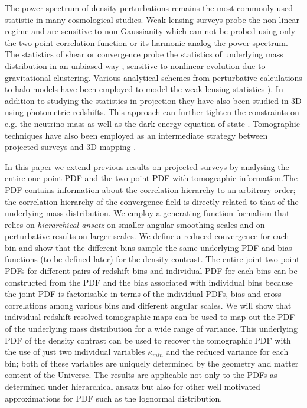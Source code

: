 \documentclass[usenatbib]{mn2e}
\begin{document}
The power spectrum of density perturbations remains the most commonly
used statistic in many cosmological studies. Weak lensing surveys probe the non-linear 
regime and are sensitive to non-Gaussianity which can not be 
probed using only the two-point correlation function or its harmonic analog the power spectrum. 
The statistics of shear or convergence probe the statistics of underlying
mass distribution in an unbiased way \citep{JSW00,MuJai01,Mu00,MuJai00,Valageas00,
VaMuBa05,TakadaWhite03,TakadaJain04}, sensitive to 
nonlinear evolution due to gravitational clustering. Various analytical schemes
from perturbative calculations to halo models have been employed to model
the weak lensing statistics \citet{Fry84,Schaeffer84, BerSch92,SzaSza93, SzaSza97, MuBaMeSch99,
MuCoMe99a, MuCoMe99b, MuMeCo99, MuCo00, MuCo02, MuCo03, CooSeth02}).
In addition to studying the statistics in projection they have also been studied in 3D using photometric
redshifts. This approach can further tighten the constraints on e.g. the neutrino mass
as well as the dark energy equation of state \citep{Heav03,HRH00, HKT06, HKV07, Castro05, Kit08}.
Tomographic techniques have also been employed as an intermediate strategy between projected
surveys and 3D mapping \citep{Hu99,TakadaJain04,TakadaJain03,Semboloni08}.

In this paper we extend previous results \citep{JSW00,MuJai01,Mu00,MuJai00,Valageas00}
on projected surveys by analysing the entire one-point PDF and
the two-point PDF with tomographic information.The PDF contains information about
the correlation hierarchy to an arbitrary order; the correlation hierarchy of 
the convergence field is directly related to that of the underlying mass distribution. 
We employ a generating function formalism that relies on {\em hierarchical ansatz} on
smaller angular smoothing scales and on perturbative results on larger scales.
We define a reduced convergence for each bin and show that the different bins 
sample the same underlying PDF and bias functions (to be defined later) for the density contrast.
The entire joint two-point PDFs for different pairs of redshift bins and 
individual PDF for each bins can be constructed from the PDF and the bias associated
with individual bins because the joint PDF is factorisable in terms of the individual
PDFs, bias and cross-correlations among various bins and different angular scales.
We will show that individual redshift-resolved tomographic maps can be used
to map out the PDF of the underlying mass distribution for a wide range of 
variance. This underlying PDF of the density contrast can be used to 
recover the tomographic PDF with the use of just two individual variables $\kappa_{min}$
and the reduced variance for each bin; both of these variables are uniquely determined by the geometry and 
matter content of the Universe. The results are applicable not only to the PDFs
as determined under hierarchical ansatz but also for other well motivated approximations
for PDF such as the lognormal distribution. 
%
\end{document}
